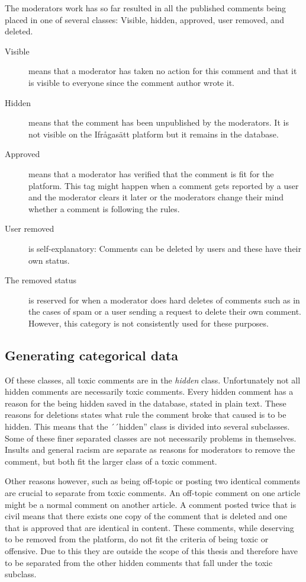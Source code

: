 \documentclass[nofilelist]{cslthse-msc}
\begin{document}
The moderators work has so far resulted in all the published comments being placed in one of several classes: Visible, hidden, approved, user removed, and deleted.%
\begin{description}
  \item[Visible] means that a moderator has taken no action for this comment and that it is visible to everyone since the comment author wrote it.
  \item[Hidden] means that the comment has been unpublished by the moderators. It is not visible on the Ifrågasätt platform but it remains in the database.
\item[Approved] means that a moderator has verified that the comment is fit for the platform. This tag might happen when a comment gets reported by a user and the moderator clears it later or the moderators change their mind whether a comment is following the rules. 
\item[User removed] is self-explanatory: Comments can be deleted by users and these have their own status. 

\item[The removed status] is reserved for when a moderator does hard deletes of comments such as in the cases of spam or a user sending a request to delete their own comment. However, this category is not consistently used for these purposes.
\end{description}

\subsection{Generating categorical data}

Of these classes, all toxic comments are in the \emph{hidden} class. Unfortunately not all hidden comments are necessarily toxic comments. Every hidden comment has a reason for the being hidden saved in the database, stated in plain text. These reasons for deletions states what rule the comment broke that caused is to be hidden. This means that the ´´hidden'' class is divided into several subclasses. Some of these finer separated classes are not necessarily problems in themselves. Insults and general racism are separate as reasons for moderators to remove the comment, but both fit the larger class of a toxic comment. 

Other reasons however, such as being off-topic or posting two identical comments are crucial to separate from toxic comments. An off-topic comment on one article might be a normal comment on another article. A comment posted twice that is civil means that there exists one copy of the comment that is deleted and one that is approved that are identical in content. These comments, while deserving to be removed from the platform, do not fit the criteria of being toxic or offensive. Due to this they are outside the scope of this thesis and therefore have to be separated from the other hidden comments that fall under the toxic subclass.
\end{document}
